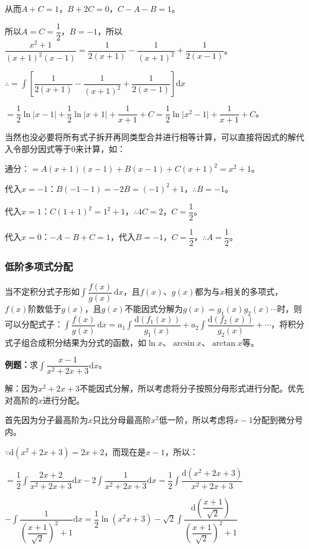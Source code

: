 \documentclass[UTF8, 12pt]{ctexart}
\begin{document}
从而$A+C=1$，$B+2C=0$，$C-A-B=1$。

所以$A=C=\dfrac{1}{2}$，$B=-1$，所以$\dfrac{x^2+1}{(x+1)^2(x-1)}=\dfrac{1}{2(x+1)}-\dfrac{1}{(x+1)^2}+\dfrac{1}{2(x-1)}$。

$\therefore=\displaystyle{\int\left[\dfrac{1}{2(x+1)}-\dfrac{1}{(x+1)^2}+\dfrac{1}{2(x-1)}\right]\textrm{d}x}$ \medskip

$=\dfrac{1}{2}\ln\vert x-1\vert+\dfrac{1}{2}\ln\vert x+1\vert+\dfrac{1}{x+1}+C=\dfrac{1}{2}\ln\vert x^2-1\vert+\dfrac{1}{x+1}+C$。

当然也没必要将所有式子拆开再同类型合并进行相等计算，可以直接将因式的解代入令部分因式等于0来计算，如：

通分：$=A(x+1)(x-1)+B(x-1)+C(x+1)^2=x^2+1$。

代入$x=-1$：$B(-1-1)=-2B=(-1)^2+1$，$\therefore B=-1$。

代入$x=1$：$C(1+1)^2=1^2+1$，$\therefore4C=2$，$C=\dfrac{1}{2}$。

代入$x=0$：$-A-B+C=1$，代入$B=-1$，$C=\dfrac{1}{2}$，$\therefore A=\dfrac{1}{2}$。

\subsubsection{低阶多项式分配}

当不定积分式子形如$\displaystyle{\int\dfrac{f(x)}{g(x)}\,\textrm{d}x}$，且$f(x)$、$g(x)$都为与$x$相关的多项式，$f(x)$阶数低于$g(x)$，且$g(x)$不能因式分解为$g(x)=g_1(x)g_2(x)\cdots$时，则可以分配式子：$\displaystyle{\int\dfrac{f(x)}{g(x)}\,\textrm{d}x=a_1\int\dfrac{\textrm{d}(f_1(x))}{g_1(x)}+a_2\int\dfrac{\textrm{d}(f_2(x))}{g_2(x)}}+\cdots$，将积分式子组合成积分结果为分式的函数，如$\ln x$、$\arcsin x$、$\arctan x$等。

\textbf{例题：}求$\displaystyle{\int\dfrac{x-1}{x^2+2x+3}\textrm{d}x}$。

解：因为$x^2+2x+3$不能因式分解，所以考虑将分子按照分母形式进行分配。优先对高阶的$x$进行分配。

首先因为分子最高阶为$x$只比分母最高阶$x^2$低一阶，所以考虑将$x-1$分配到微分号内。

$\because\textrm{d}(x^2+2x+3)=2x+2$，而现在是$x-1$，所以：

$=\displaystyle{\dfrac{1}{2}\int\dfrac{2x+2}{x^2+2x+3}\textrm{d}x-2\int\dfrac{1}{x^2+2x+3}\textrm{d}x}=\displaystyle{\dfrac{1}{2}\int\dfrac{\textrm{d}(x^2+2x+3)}{x^2+2x+3}}$

$-\displaystyle{\int\dfrac{1}{\left(\dfrac{x+1}{\sqrt{2}}\right)^2+1}\textrm{d}x}=\displaystyle{\dfrac{1}{2}\ln(x^2x+3)-\sqrt{2}\int\dfrac{\textrm{d}\left(\dfrac{x+1}{\sqrt{2}}\right)}{\left(\dfrac{x+1}{\sqrt{2}}\right)^2+1}}$
\end{document}
